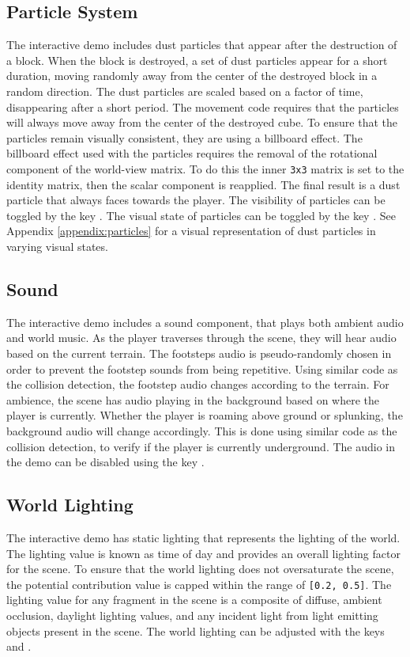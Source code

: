 \documentclass[a4paper,11pt,titlepage]{scrartcl}
\begin{document}
\subsection{Particle System}
The interactive demo includes dust particles that appear after the destruction of a block.  When the block is destroyed, a set of dust particles appear for a short duration, moving randomly away from the center of the destroyed block in a random direction.  The dust particles are scaled based on a factor of time, disappearing after a short period.  The movement code requires that the particles will always move away from the center of the destroyed cube.  To ensure that the particles remain visually consistent, they are using a billboard effect.  The billboard effect used with the particles requires the removal of the rotational component of the world-view matrix.  To do this the inner \texttt{3x3} matrix is set to the identity matrix, then the scalar component is reapplied.  The final result is a dust particle that always faces towards the player.
\vskip 2.5mm\noindent
The visibility of particles can be toggled by the key .  The visual state of particles can be toggled by the key .  See Appendix \ref{appendix:particles} for a visual representation of dust particles in varying visual states.

\subsection{Sound}
The interactive demo includes a sound component, that plays both ambient audio and world music.  As the player traverses through the scene, they will hear audio based on the current terrain.  The footsteps audio is pseudo-randomly chosen in order to prevent the footstep sounds from being repetitive.  Using similar code as the collision detection, the footstep audio changes according to the terrain.  For ambience, the scene has audio playing in the background based on where the player is currently.  Whether the player is roaming above ground or splunking, the background audio will change accordingly.  This is done using similar code as the collision detection, to verify if the player is currently underground.
\vskip 2.5mm\noindent
The audio in the demo can be disabled using the key .
    
\subsection{World Lighting}
The interactive demo has static lighting that represents the lighting of the world.  The lighting value is known as time of day and provides an overall lighting factor for the scene.  To ensure that the world lighting does not oversaturate the scene, the potential contribution value is capped within the range of \texttt{[0.2, 0.5]}.  The lighting value for any fragment in the scene is a composite of diffuse, ambient occlusion, daylight lighting values, and any incident light from light emitting objects present in the scene.
\vskip 2.5mm\noindent
The world lighting can be adjusted with the keys  and .
    
\end{document}
